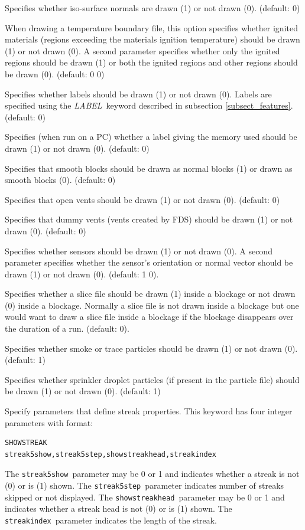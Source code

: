 \documentclass[11pt,twoside]{book}
\newcommand{\hitem}[1]{\item[{\bf #1} \hfill]}
\begin{document}
\hitem{SHOWISONORMALS} Specifies whether iso-surface normals are drawn (1) or not drawn (0).  (default: 0)

\hitem{SHOWIGNITION} When drawing a temperature boundary file, this option
specifies whether ignited materials (regions exceeding the materials ignition temperature) should be drawn (1) or not drawn (0).  A second parameter specifies whether only the ignited regions should be drawn (1) or both the ignited regions and other regions should be drawn (0).
(default: 0 0)


\hitem{SHOWLABELS}Specifies whether labels should be drawn (1) or
not drawn (0).  Labels are specified using the {\em LABEL}\
keyword described in subsection \ref{subsect_features}. (default:
0)

\hitem{SHOWMEMLOAD} Specifies (when run on a PC) whether a label
giving the memory used should be drawn (1) or not drawn (0).
(default: 0)

\hitem{SHOWNORMALWHENSMOOTH} Specifies that smooth blocks
should be drawn as normal blocks (1) or drawn as smooth
blocks (0). (default: 0)

\hitem{SHOWOPENVENTS} Specifies that open vents should be drawn
(1) or not drawn (0).  (default: 0)

\hitem{SHOWDUMMYVENTS} Specifies that dummy vents (vents created
by FDS) should be drawn (1) or not drawn (0).  (default: 0)

\hitem{SHOWSENSORS} Specifies whether sensors should be drawn (1) or not drawn (0).
A second parameter specifies whether the sensor's orientation or normal vector
should be drawn (1) or not drawn (0). (default: 1 0).

\hitem{SHOWSLICEINOBST} Specifies whether a slice file should be drawn (1) inside
a blockage or not drawn (0) inside a blockage.  Normally a slice file is not drawn inside a blockage but one would want to draw a
slice file inside a blockage if the blockage disappears over the duration of a run.  (default: 0).


\hitem{SHOWSMOKEPART}Specifies whether smoke or trace particles
should be drawn (1) or not drawn (0). (default: 1)

\hitem{SHOWSPRINKPART}Specifies whether
sprinkler droplet particles (if present in the particle file)
should be drawn (1) or not drawn (0).
(default: 1)

\hitem{SHOWSTREAK}Specify parameters that define streak properties.  This keyword
has four integer parameters with format:
\begin{lstlisting}
SHOWSTREAK
streak5show,streak5step,showstreakhead,streakindex
\end{lstlisting}
The {\tt streak5show}\ parameter may be 0 or 1 and indicates whether a
streak is not (0) or is (1) shown. The {\tt streak5step}\ parameter
indicates number of streaks skipped or not displayed.
The {\tt showstreakhead}\ parameter may be 0 or 1 and indicates whether a streak head is not (0) or is (1) shown.
The {\tt streakindex}\ parameter indicates the length of the streak.
\end{document}
